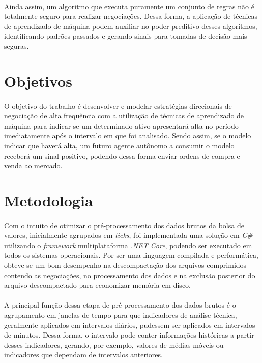 \documentclass[grad,numbers]{coppe}
\begin{document}
    \paragraph{}Ainda assim, um algoritmo que executa puramente um conjunto de regras não é totalmente seguro para realizar negociações. Dessa forma, a aplicação de técnicas de aprendizado de máquina podem auxiliar no poder preditivo desses algoritmos, identificando padrões passados e gerando sinais para tomadas de decisão mais seguras.
    
  \section{Objetivos}
  
    \paragraph{}O objetivo do trabalho é desenvolver e modelar estratégias direcionais de negociação de alta frequência com a utilização de técnicas de aprendizado de máquina para indicar se um determinado ativo apresentará alta no período imediatamente após o intervalo em que foi analisado. Sendo assim, se o modelo indicar que haverá alta, um futuro agente autônomo a consumir o modelo receberá um sinal positivo, podendo dessa forma enviar ordens de compra e venda ao mercado. 
  
  \section{Metodologia}
  
    \paragraph{}Com o intuito de otimizar o pré-processamento dos dados brutos da bolsa de valores, inicialmente agrupados em \textit{ticks}, foi implementada uma solução em \textit{C\#} utilizando o \textit{framework} multiplataforma \textit{.NET Core}, podendo ser executado em todos os sistemas operacionais. Por ser uma linguagem compilada e performática, obteve-se um bom desempenho na descompactação dos arquivos comprimidos contendo as negociações, no processamento dos dados e na exclusão posterior do arquivo descompactado para economizar memória em disco.
    
    \paragraph{}A principal função dessa etapa de pré-processamento dos dados brutos é o agrupamento em janelas de tempo para que indicadores de análise técnica, geralmente aplicados em intervalos diários, pudessem ser aplicados em intervalos de minutos. Dessa forma, o intervalo pode conter informações históricas a partir desses indicadores, gerando, por exemplo, valores de médias móveis ou indicadores que dependam de intervalos anteriores. 
    
\end{document}
